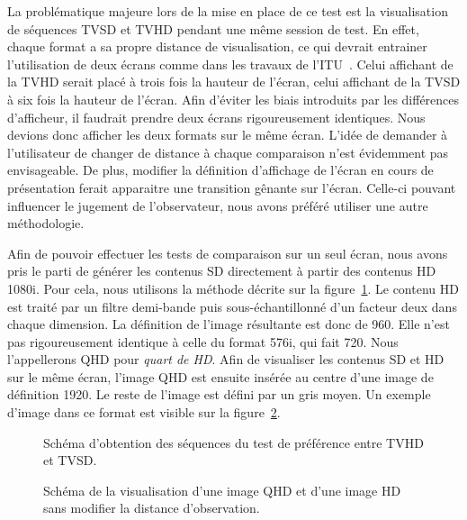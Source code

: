 La problématique majeure lors de la mise en place de ce test est la visualisation de séquences TVSD et TVHD pendant une même session de test. En effet, chaque format a sa propre distance de visualisation, ce qui devrait entrainer l'utilisation de deux écrans comme dans les travaux de l'ITU~\cite{itu-crtlcd}. Celui affichant de la TVHD serait placé à trois fois la hauteur de l'écran, celui affichant de la TVSD à six fois la hauteur de l'écran. Afin d'éviter les biais introduits par les différences d'afficheur, il faudrait prendre deux écrans rigoureusement identiques. Nous devions donc afficher les deux formats sur le même écran. L'idée de demander à l'utilisateur de changer de distance à chaque comparaison n'est évidemment pas envisageable. De plus, modifier la définition d'affichage de l'écran en cours de présentation ferait apparaitre une transition gênante sur l'écran. Celle-ci pouvant influencer le jugement de l'observateur, nous avons préféré utiliser une autre méthodologie.

Afin de pouvoir effectuer les tests de comparaison sur un seul écran, nous avons pris le parti de générer les contenus SD directement à partir des contenus HD 1080i. Pour cela, nous utilisons la méthode décrite sur la figure~\ref{fig:schemahdvssd}. Le contenu HD est traité par un filtre demi-bande puis sous-échantillonné d'un facteur deux dans chaque dimension. La définition de l'image résultante est donc de 960. Elle n'est pas rigoureusement identique à celle du format 576i, qui fait 720. Nous l'appellerons QHD pour \emph{quart de HD}. Afin de visualiser les contenus SD et HD sur le même écran, l'image QHD est ensuite insérée au centre d'une image de définition 1920. Le reste de l'image est défini par un gris moyen. Un exemple d'image dans ce format est visible sur la figure~\ref{fig:vueQHD}.

\begin{figure}[htbp]
	\centering
	
	\caption{Schéma d'obtention des séquences du test de préférence entre TVHD et TVSD.}
	\label{fig:schemahdvssd}
\end{figure}

\begin{figure}[htbp]
	\centering
	
	\caption{Schéma de la visualisation d'une image QHD et d'une image HD sans modifier la distance d'observation.}
	\label{fig:vueQHD}
\end{figure}

